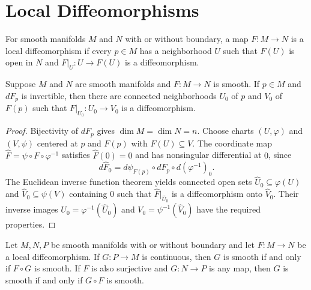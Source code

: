 
\section{Local Diffeomorphisms}

\begin{definition}
\label{def:4-22-extra-1}
\leanok
For smooth manifolds $M$ and $N$ with or without boundary, a map $F:M\to N$ is a local diffeomorphism if every $p\in M$ has a neighborhood $U$ such that $F(U)$ is open in $N$ and $F|_U:U\to F(U)$ is a diffeomorphism.
\end{definition}

\begin{theorem}
\label{thm:4-5}
\leanok
{}
Suppose $M$ and $N$ are smooth manifolds and $F:M\to N$ is smooth. If $p\in M$ and $dF_p$ is invertible, then there are connected neighborhoods $U_0$ of $p$ and $V_0$ of $F(p)$ such that $F|_{U_0}:U_0\to V_0$ is a diffeomorphism.
\end{theorem}

\begin{proof}
\leanok
\sketch
Bijectivity of $dF_p$ gives $\dim M=\dim N=n$. Choose charts $(U,\varphi)$ and $(V,\psi)$ centered at $p$ and $F(p)$ with $F(U)\subseteq V$. The coordinate map $\widehat F=\psi\circ F\circ\varphi^{-1}$ satisfies $\widehat F(0)=0$ and has nonsingular differential at $0$, since
\[
d\widehat F_0=d\psi_{F(p)}\circ dF_p\circ d(\varphi^{-1})_0.
\]
The Euclidean inverse function theorem yields connected open sets $\widehat U_0\subseteq\varphi(U)$ and $\widehat V_0\subseteq\psi(V)$ containing $0$ such that $\widehat F|_{\widehat U_0}$ is a diffeomorphism onto $\widehat V_0$. Their inverse images $U_0=\varphi^{-1}(\widehat U_0)$ and $V_0=\psi^{-1}(\widehat V_0)$ have the required properties.
\end{proof}

\begin{proposition}
\label{exer:4-10}
\leanok
{}
Let $M,N,P$ be smooth manifolds with or without boundary and let $F:M\to N$ be a local diffeomorphism. If $G:P\to M$ is continuous, then $G$ is smooth if and only if $F\circ G$ is smooth. If $F$ is also surjective and $G:N\to P$ is any map, then $G$ is smooth if and only if $G\circ F$ is smooth.
\end{proposition}

